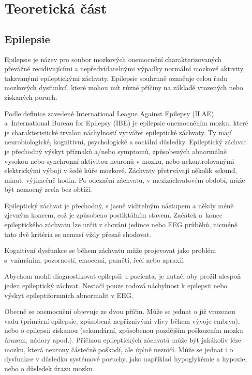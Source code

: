 
\chapter{Teoretická část}

\section{Epilepsie}
Epilepsie je název pro soubor mozkových onemocnění charakterizovaných převážně recidivujícími a nepředvídatelnými výpadky normální mozkové aktivity, takzvanými epileptickými záchvaty. Epilepsie souhrnně označuje celou řadu mozkových dysfunkcí, které mohou mít různé příčiny na základě vrozených nebo získaných poruch.
\cite{1}

Podle definice zavedené International League Against Epilepsy (ILAE) a~International Bureau for Epilepsy (IBE) je epilepsie onemocněním mozku, které je charakteristické trvalou náchylností vytvářet epileptické záchvaty. Ty mají neurobiologické, kognitivní, psychologické a sociální důsledky. Epileptický záchvat je přechodný výskyt příznaků a/nebo symptomů, způsobených abnormálně vysokou nebo synchronní aktivitou neuronů v mozku, nebo nekontrolovanými elektrickými výboji v šedé kůře mozkové. Záchvaty přetrvávají několik sekund, minut, výjimečně hodin. Po odeznění záchvatu, v mezizáchvatovém období, může být nemocný zcela bez obtíží. \cite{2,1}

Epileptický záchvat je přechodný, s jasně viditelným nástupem a někdy méně zjevným koncem, což je způsobeno postiktálním stavem. Začátek a~konec epileptického záchvatu lze určit z chování jedince nebo EEG průběhů, nicméně tato dvě kritéria se nemusí vždy přesně shodovat. \cite{1}

Kognitivní dysfunkce se během záchvatu může projevovat jako problém s~vnímáním, pozorností, emocemi, pamětí, řečí nebo apraxií.

Abychom mohli diagnostikovat epilepsii u pacienta, je nutné, aby prožil alespoň jeden epileptický záchvat. Nestačí pouze rodová náchylnost k epilepsii nebo výskyt epileptiformních abnormalit v EEG. \cite{1}

Obecně se onemocnění objevuje ze dvou příčin. Může se jednat o již vrozenou vadu (primární epilepsie, způsobená nepříznivými vlivy během vývoje embrya), nebo o epilepsii získanou (sekundární, způsobenou pozdějším poškozením mozku úrazem, nádory apod.). Příčinou epileptických záchvatů může být jakákoliv léze mozku, která neurony částečně poškodí, ale úplně nezničí. Může se jednat i o dysfunkce v důsledku systémové poruchy, jako například hypoglykémie a hypoxie, nebo o důsledek úrazu mozku. \cite{2}

